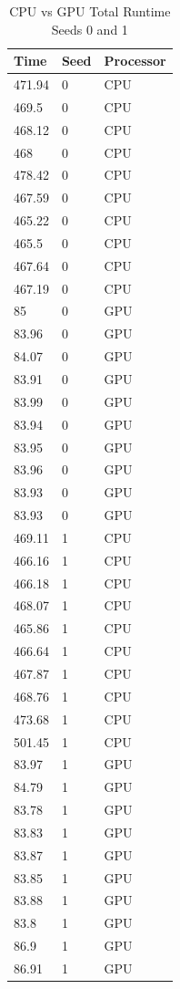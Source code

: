 \documentclass{acm_proc_article-sp}
\begin{document}
\begin{table}
\caption{CPU vs GPU Total Runtime Seeds 0 and 1}
\centering
 \begin{tabular}{ | l | l | l |}
    \hline
    Time & Seed & Processor \\ \hline
    471.94 & 0 & CPU \\ \hline
    469.5 & 0 & CPU \\ \hline
    468.12 & 0 & CPU \\ \hline
    468 & 0 & CPU \\ \hline
    478.42 & 0 & CPU \\ \hline
    467.59 & 0 & CPU \\ \hline
    465.22 & 0 & CPU \\ \hline
    465.5 & 0 & CPU \\ \hline
    467.64 & 0 & CPU \\ \hline
    467.19 & 0 & CPU \\ \hline
    85 & 0 & GPU \\ \hline
    83.96 & 0 & GPU \\ \hline
    84.07 & 0 & GPU \\ \hline
    83.91 & 0 & GPU \\ \hline
    83.99 & 0 & GPU \\ \hline
    83.94 & 0 & GPU \\ \hline
    83.95 & 0 & GPU \\ \hline
    83.96 & 0 & GPU \\ \hline
    83.93 & 0 & GPU \\ \hline
    83.93 & 0 & GPU \\ \hline
    469.11 & 1 & CPU \\ \hline
    466.16 & 1 & CPU \\ \hline
    466.18 & 1 & CPU \\ \hline
    468.07 & 1 & CPU \\ \hline
    465.86 & 1 & CPU \\ \hline
    466.64 & 1 & CPU \\ \hline
    467.87 & 1 & CPU \\ \hline
    468.76 & 1 & CPU \\ \hline
    473.68 & 1 & CPU \\ \hline
    501.45 & 1 & CPU \\ \hline
    83.97 & 1 & GPU \\ \hline
    84.79 & 1 & GPU \\ \hline
    83.78 & 1 & GPU \\ \hline
    83.83 & 1 & GPU \\ \hline
    83.87 & 1 & GPU \\ \hline
    83.85 & 1 & GPU \\ \hline
    83.88 & 1 & GPU \\ \hline
    83.8 & 1 & GPU \\ \hline
    86.9 & 1 & GPU \\ \hline
    86.91 & 1 & GPU \\ \hline
    \end{tabular}
\label{table:CPU vs GPU total runtime}
\end{table}
\end{document}
